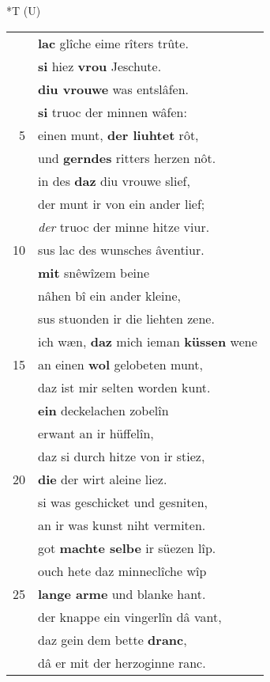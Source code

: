 \documentclass[8pt,a4paper,notitlepage]{article}
\begin{document}
\begin{table}[ht]
\begin{minipage}[t]{0.5\linewidth}
\end{minipage}
\hspace{0.5cm}
\begin{minipage}[t]{0.5\linewidth}
\small
\begin{center}*T (U)
\end{center}
\begin{tabular}{rl}
 & \textbf{lac} glîche eime rîters trûte.\\ 
 & \textbf{si} hiez \textbf{vrou} Jeschute.\\ 
 & \textbf{diu vrouwe} was entslâfen.\\ 
 & \textbf{si} truoc der minnen wâfen:\\ 
5 & einen munt, \textbf{der liuhtet} rôt,\\ 
 & und \textbf{gerndes} ritters herzen nôt.\\ 
 & in des \textbf{daz} diu vrouwe slief,\\ 
 & der munt ir von ein ander lief;\\ 
 & \textit{der} truoc der minne hitze viur.\\ 
10 & sus lac des wunsches âventiur.\\ 
 & \textbf{mit} snêwîzem beine\\ 
 & nâhen bî ein ander kleine,\\ 
 & sus stuonden ir die liehten zene.\\ 
 & ich wæn, \textbf{daz} mich ieman \textbf{küssen} wene\\ 
15 & an einen \textbf{wol} gelobeten munt,\\ 
 & daz ist mir selten worden kunt.\\ 
 & \textbf{ein} deckelachen zobelîn\\ 
 & erwant an ir hüffelîn,\\ 
 & daz si durch hitze von ir stiez,\\ 
20 & \textbf{die} der wirt aleine liez.\\ 
 & si was geschicket und gesniten,\\ 
 & an ir was kunst niht vermiten.\\ 
 & got \textbf{machte selbe} ir süezen lîp.\\ 
 & ouch hete daz minneclîche wîp\\ 
25 & \textbf{lange arme} und blanke hant.\\ 
 & der knappe ein vingerlîn dâ vant,\\ 
 & daz gein dem bette \textbf{dranc},\\ 
 & dâ er mit der herzoginne ranc.\\ 

\end{tabular}
\end{minipage}
\end{table}
\end{document}
